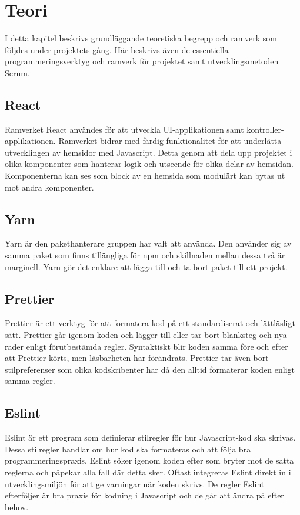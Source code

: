 \chapter{Teori}
\label{cha:theory}
I detta kapitel beskrivs grundläggande teoretiska begrepp och ramverk som följdes under projektets gång. Här beskrivs även de essentiella programmeringsverktyg och ramverk för projektet samt utvecklingsmetoden Scrum.

\section{React}
Ramverket React användes för att utveckla UI-applikationen samt kontroller-applikationen. Ramverket bidrar med färdig funktionalitet för att underlätta utvecklingen av hemsidor med Javascript. Detta genom att dela upp projektet i olika komponenter som hanterar logik och utseende för olika delar av hemsidan. Komponenterna kan ses som block av en hemsida som modulärt kan bytas ut mot andra komponenter.~\cite{React}

\section{Yarn}
Yarn är den pakethanterare gruppen har valt att använda. Den använder sig av samma paket som finns tillängliga för npm och skillnaden mellan dessa två är marginell. Yarn gör det enklare att lägga till och ta bort paket till ett projekt.~\cite{Yarn}

\section{Prettier}
Prettier är ett verktyg för att formatera kod på ett standardiserat och lättläsligt sätt. Prettier går igenom koden och lägger till eller tar bort blanksteg och nya rader enligt förutbestämda regler. Syntaktiskt blir koden samma före och efter att Prettier körts, men läsbarheten har förändrats. Prettier tar även bort stilpreferenser som olika kodskribenter har då den alltid formaterar koden enligt samma regler.~\cite{prettier}


\section{Eslint}
Eslint är ett program som definierar stilregler för hur Javascript-kod ska skrivas. Dessa stilregler handlar om hur kod ska formateras och att följa bra programmeringspraxis. Eslint söker igenom koden efter som bryter mot de satta reglerna och påpekar alla fall där detta sker. Oftast integreras Eslint direkt in i utvecklingsmiljön för att ge varningar när koden skrivs. De regler Eslint efterföljer är bra praxis för kodning i Javascript och de går att ändra på efter behov.~\cite{eslint}


